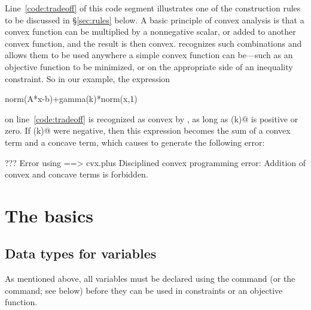 \documentclass[12pt]{article}
\begin{document}
Line~\ref{code:tradeoff} of this code segment illustrates one of the
construction rules to be discussed in \S\ref{sec:rules} below. 
A basic principle of convex analysis is that a convex function
can be multiplied by a nonnegative scalar,
or added to another convex function, and the result
is then convex. 
\cvx recognizes such combinations and allows
them to be used anywhere a simple convex function can be---such as 
an objective function to be minimized, or on the appropriate side 
of an inequality constraint. So in our example, the expression
\begin{code}
	norm(A*x-b)+gamma(k)*norm(x,1)
\end{code}
on line~\ref{code:tradeoff}
is recognized as convex by \cvx, as long as \verb@gamma(k)@
is positive or zero. If \verb@gamma(k)@ were negative, then
this expression becomes the sum of a convex term and a concave
term, which causes \cvx
to generate the following error:
\begin{code}
??? Error using ==> cvx.plus
Disciplined convex programming error:
Addition of convex and concave terms is forbidden.
\end{code}

\newpage
\section{The basics}

\subsection{Data types for variables}

As mentioned above, all variables must be declared using the \verb@variable@
command (or the \verb@variables@ command; see below) before they can be
used in constraints or an objective function. 
\end{document}
